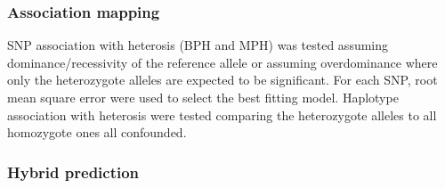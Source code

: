 \documentclass[10pt]{article}
\begin{document}
\subsubsection*{Association mapping}
SNP association with heterosis (BPH and MPH) was tested assuming dominance/recessivity of the reference allele or assuming overdominance where only the heterozygote alleles are expected to be significant. For each SNP, root mean square error were used to select the best fitting model. 
Haplotype association with heterosis were tested comparing the heterozygote alleles to all homozygote ones all confounded. 


\subsubsection*{Hybrid prediction}


\clearpage

\end{document}
